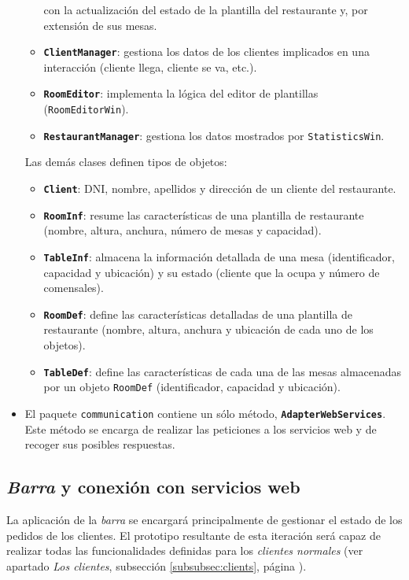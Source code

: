\begin{itemize}
\begin{itemize}
  con la actualización del estado de la plantilla del restaurante y, por
  extensión de sus mesas.
  \item \textbf{\texttt{ClientManager}}: gestiona los datos de los clientes 
  implicados en una interacción (cliente llega, cliente se va, etc.).
  \item \textbf{\texttt{RoomEditor}}: implementa la lógica del editor de 
  plantillas (\texttt{RoomEditorWin}).
  \item \textbf{\texttt{RestaurantManager}}: gestiona los datos mostrados por
  \texttt{StatisticsWin}.
  \end{itemize}
Las demás clases definen tipos de objetos:
  \begin{itemize}
  \item \textbf{\texttt{Client}}: DNI, nombre, apellidos y dirección de un 
  cliente del restaurante.
  \item \textbf{\texttt{RoomInf}}: resume las características de una plantilla 
  de restaurante (nombre, altura, anchura, número de mesas y capacidad).
  \item \textbf{\texttt{TableInf}}: almacena la información detallada de una 
  mesa (identificador, capacidad y ubicación) y su estado (cliente que la ocupa 
  y número de comensales).
  \item \textbf{\texttt{RoomDef}}: define las características detalladas de una
  plantilla de restaurante (nombre, altura, anchura y ubicación de cada uno
  de los objetos).
  \item \textbf{\texttt{TableDef}}: define las características de cada una de 
  las mesas almacenadas por un objeto \texttt{RoomDef} (identificador, capacidad
  y ubicación).
  \end{itemize} 
\item El paquete \texttt{communication} contiene un sólo método,
\textbf{\texttt{AdapterWebServices}}. Este método se encarga de realizar las 
peticiones a los servicios web y de recoger sus posibles respuestas.
\end{itemize}

\subsection{\emph{Barra} y conexión con servicios web}
La aplicación de la \emph{barra} se encargará principalmente de gestionar el
estado de los pedidos de los clientes. El prototipo resultante de esta
iteración será capaz de realizar todas las funcionalidades definidas para
los \emph{clientes normales} (ver apartado \emph{Los clientes},
subsección \ref{subsubsec:clients}, página \pageref{subsubsec:clients}).

